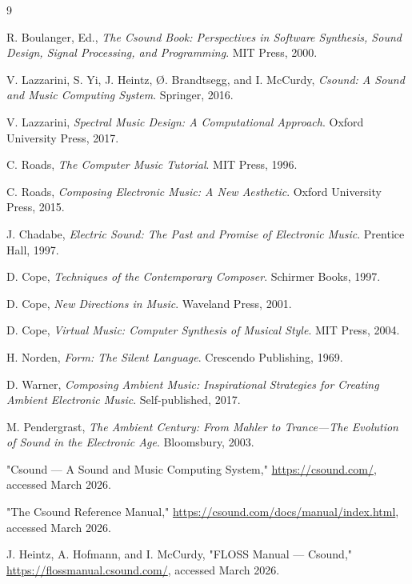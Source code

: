 \documentclass[a4paper]{article}
\begin{document}
\begin{thebibliography}{9}

R. Boulanger, Ed., \textit{The Csound Book: Perspectives in Software Synthesis, Sound Design, Signal Processing, and Programming}. MIT Press, 2000.

V. Lazzarini, S. Yi, J. Heintz, Ø. Brandtsegg, and I. McCurdy, \textit{Csound: A Sound and Music Computing System}. Springer, 2016.

V. Lazzarini, \textit{Spectral Music Design: A Computational Approach}. Oxford University Press, 2017.

C. Roads, \textit{The Computer Music Tutorial}. MIT Press, 1996.

C. Roads, \textit{Composing Electronic Music: A New Aesthetic}. Oxford University Press, 2015.

J. Chadabe, \textit{Electric Sound: The Past and Promise of Electronic Music}. Prentice Hall, 1997.

D. Cope, \textit{Techniques of the Contemporary Composer}. Schirmer Books, 1997.

D. Cope, \textit{New Directions in Music}. Waveland Press, 2001.

D. Cope, \textit{Virtual Music: Computer Synthesis of Musical Style}. MIT Press, 2004.

H. Norden, \textit{Form: The Silent Language}. Crescendo Publishing, 1969.

D. Warner, \textit{Composing Ambient Music: Inspirational Strategies for Creating Ambient Electronic Music}. Self-published, 2017.

M. Pendergrast, \textit{The Ambient Century: From Mahler to Trance---The Evolution of Sound in the Electronic Age}. Bloomsbury, 2003.

"Csound — A Sound and Music Computing System," \url{https://csound.com/}, accessed March 2026.

"The Csound Reference Manual," \url{https://csound.com/docs/manual/index.html}, accessed March 2026.

J. Heintz, A. Hofmann, and I. McCurdy, "FLOSS Manual — Csound," \url{https://flossmanual.csound.com/}, accessed March 2026.


\end{thebibliography}
\end{document}
